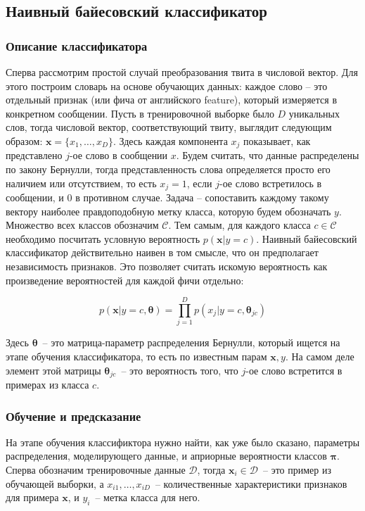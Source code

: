 \subsection{Наивный байесовский классификатор}
\subsubsection{Описание классификатора}
Сперва рассмотрим простой случай преобразования твита в числовой вектор. Для этого построим словарь
на основе обучающих данных: каждое слово -- это отдельный признак (или фича от английского feature),
который измеряется в конкретном сообщении. Пусть в тренировочной выборке было $D$ уникальных слов,
тогда числовой вектор, соответствующий твиту, выглядит следующим образом:
$\mathbf{x} = \{x_1,\ldots,x_D \}$. Здесь каждая компонента $x_j$ показывает, как представлено
$j$-ое слово в сообщении $x$. Будем считать, что данные распределены по закону Бернулли, тогда
представленность слова определяется просто его наличием или отсутствием, то есть $x_j = 1$, если
$j$-ое слово встретилось в сообщении, и $0$ в противном случае. Задача -- сопоставить каждому такому
вектору наиболее правдоподобную метку класса, которую будем обозначать $y$. Множество всех классов
обозначим $\mathcal{C}$. Тем самым, для каждого класса $c \in \mathcal{C}$ необходимо посчитать
условную вероятность $p(\mathbf{x}|y=c)$. Наивный байесовский классификатор действительно наивен в
том смысле, что он предполагает независимость признаков. Это позволяет считать искомую вероятность
как произведение вероятностей для каждой фичи отдельно:

\begin{equation}
  p(\mathbf{x}|y=c,\mathbf{\theta}) = \prod_{j=1}^Dp(x_j|y=c,\mathbf{\theta}_{jc})
  \label{eq:nbprob}
\end{equation}

Здесь $\mathbf{\theta}$~-- это матрица-параметр распределения Бернулли, который ищется на этапе
обучения классификатора, то есть по известным парам $\mathbf{x}, y$. На самом деле элемент этой
матрицы  $\mathbf{\theta}_{jc}$~-- это вероятность того, что $j$-ое слово встретится в примерах из класса $c$.


\subsubsection{Обучение и предсказание}
На этапе обучения классификтора нужно найти, как уже было сказано, параметры распределения,
моделирующего данные, и априорные вероятности классов $\mathbf{\pi}$. Сперва обозначим тренировочные
данные $\mathcal{D}$, тогда $\mathbf{x}_i \in \mathcal{D}$~-- это пример из обучающей выборки, а
$x_{i1},\ldots,x_{iD}$~-- количественные характеристики признаков для примера $\mathbf{x}$, и $y_i$~-- метка класса для него.

